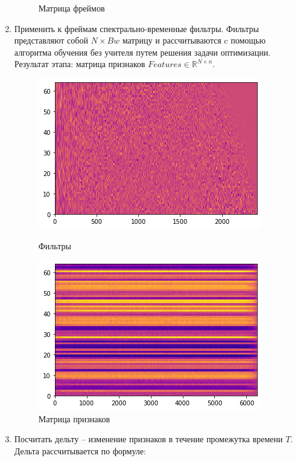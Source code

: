 \begin{enumerate}[label=\arabic*.]
\begin{figure}[H]
\begin{center}
            \caption{Матрица фреймов}
        \end{center}
    \end{figure}
    \item Применить к фреймам спектрально-временные фильтры. Фильтры представляют собой
    $N \times Bw$ матрицу и рассчитываются c помощью алгоритма обучения без учителя
    путем решения задачи оптимизации.\\
    Результат этапа: матрица признаков $Features \in \mathbb{R}^{N \times n}$.
    \begin{figure}[H]
        \begin{minipage}{.5\textwidth}
            \centering
            \includegraphics[scale=0.6]{inc/img/filters.png}
            \caption{Фильтры}
        \end{minipage}%
        \begin{minipage}{.5\textwidth}
            \centering
            \includegraphics[scale=0.6]{inc/img/features.png}
            \caption{Матрица признаков}
        \end{minipage}
    \end{figure}
    \item Посчитать дельту -- изменение признаков в течение промежутка времени $T$.
    Дельта рассчитывается по формуле:

\end{enumerate}
